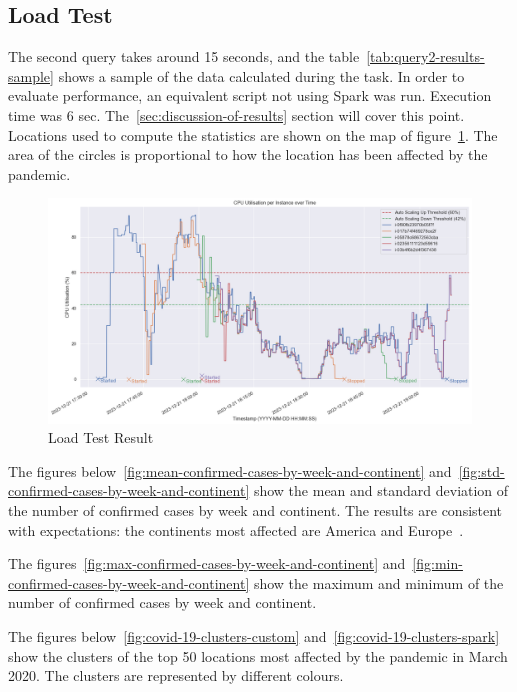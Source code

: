 \documentclass[12pt,oneside]{book} %
\begin{document}
\newpage
\subsection{Load Test}

The second query takes around 15 seconds, and the
table~\ref{tab:query2-results-sample} shows a sample of the data calculated
during the task. In order to evaluate performance, an equivalent script not
using Spark was run. Execution time was 6 sec.
The~\ref{sec:discussion-of-results} section will cover this point. Locations
used to compute the statistics are shown on the map of
figure~\ref{fig:top-100-locations-most-affected}. The area of the circles is
proportional to how the location has been affected by the pandemic.

\begin{figure}[H]
    \centering
    \includegraphics[width=1\linewidth]{images/autoscaling-test.png}
    \caption{Load Test Result}\label{fig:top-100-locations-most-affected}
\end{figure}

\newpage

The figures below~\ref{fig:mean-confirmed-cases-by-week-and-continent}
and~\ref{fig:std-confirmed-cases-by-week-and-continent} show the mean and
standard deviation of the number of confirmed cases by week and continent. The
results are consistent with expectations: the continents most affected are
America and Europe~\cite{NYT}.

\newpage
The figures~\ref{fig:max-confirmed-cases-by-week-and-continent} and~\ref{fig:min-confirmed-cases-by-week-and-continent} show the maximum and minimum of the number of confirmed cases by week and continent.

\newpage

The figures below~\ref{fig:covid-19-clusters-custom}
and~\ref{fig:covid-19-clusters-spark} show the clusters of the top 50 locations
most affected by the pandemic in March 2020. The clusters are represented by
different colours.
\end{document}
